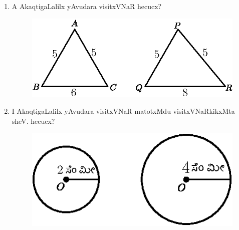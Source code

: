 \begin{enumerate}
\item A AkaqtigaLalilx yAvudara visitxVNaR hecucx?
\begin{figure}[H]
\centering
\includegraphics{src/figures/exr46.eps}
\end{figure}

\item I AkaqtigaLalilx yAvudara visitxVNaR matotxMdu visitxVNaRkikxMta sheV. hecucx?
\begin{figure}[H]
\centering
\includegraphics{src/figures/exr47.eps}
\end{figure}

\end{enumerate}
